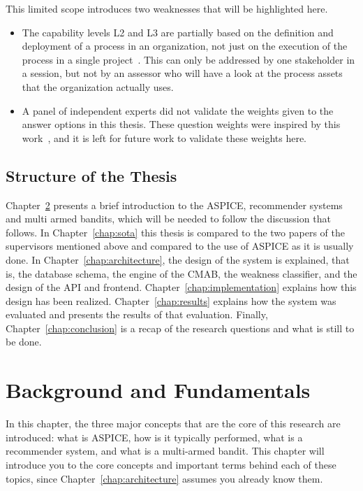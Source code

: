 \documentclass[a4paper, 12pt, oneside, openany, BCOR1cm,toc=chapterentrywithdots]{scrbook}
\begin{document}
This limited scope introduces two weaknesses that will be highlighted here.

\begin{itemize}
  \item The capability levels L2 and L3 are partially based on the definition and deployment of a
  process in an organization, not just on the execution of the process in a single
  project~\cite{vdaqmc2023pam}. This can only be addressed by one stakeholder in a session, but
  not by an assessor who will have a look at the process assets that the organization actually
  uses.
  \item A panel of independent experts did not validate the weights given to the answer options
  in this thesis. These question weights were inspired by this
  work~\cite{datsogiannis2024early}, and it is left for future work to validate these weights
  here.
\end{itemize}

\section{Structure of the Thesis}

Chapter~\ref{chap:background} presents a brief introduction to the ASPICE, recommender systems
and multi armed bandits, which will be needed to follow the discussion that follows. In
Chapter~\ref{chap:sota} this thesis is compared to the two papers of the supervisors mentioned
above and compared to the use of ASPICE as it is usually done. In Chapter~\ref{chap:architecture},
the design of the system is explained, that is, the database schema, the engine of the CMAB, the
weakness classifier, and the design of the API and frontend. Chapter~\ref{chap:implementation}
explains how this design has been realized. Chapter~\ref{chap:results} explains how the system
was evaluated and presents the results of that evaluation. Finally, Chapter~\ref{chap:conclusion}
is a recap of the research questions and what is still to be done.

\chapter{Background and Fundamentals}
\label{chap:background}
% 

In this chapter, the three major concepts that are the core of this research are introduced: what
is ASPICE, how is it typically performed, what is a recommender system, and what is a
multi-armed bandit. This chapter will introduce you to the core concepts and important terms
behind each of these topics, since Chapter~\ref{chap:architecture} assumes you already know them.
\end{document}
